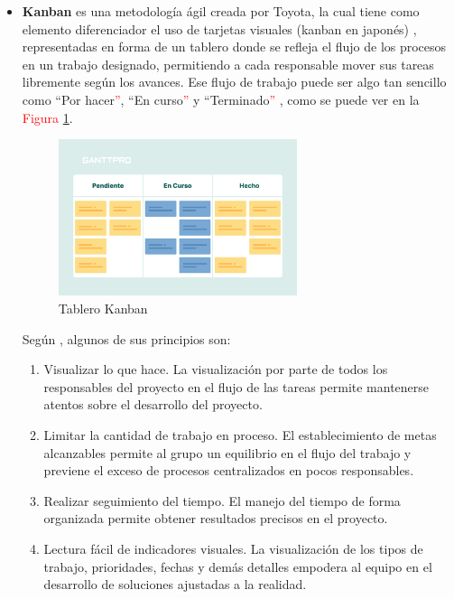 \begin{itemize}
            \item \textbf{Kanban} es una metodología ágil creada por Toyota, la cual tiene como elemento diferenciador el uso de tarjetas visuales (kanban en japonés) \cite{pzt_metodologias_nodate}, representadas en forma de un tablero donde se refleja el flujo de los procesos en un trabajo designado, permitiendo a cada responsable mover sus tareas libremente según los avances. Ese flujo de trabajo puede ser algo tan sencillo como ``Por hacer\textcolor{red}{''}, %
            ``En curso\textcolor{red}{''} y %
            ``Terminado\textcolor{red}{''} %
            \cite{atlassian_que_nodate-1}, como se puede ver en la \textcolor{red}{Figura} %
            \ref{fig:metodologia:kanban}.
    
            \begin{figure}[h]
                \centering
                \includegraphics[width=0.66\textwidth]{figures/kanban.png}
                \caption[Tablero Kanban, extraído de \cite{stsepanets_metodo_2024}]{Tablero Kanban}
                \label{fig:metodologia:kanban}
            \end{figure}
            
    
            Según \cite{valtx_metodologias_2023}, algunos de sus principios son: 
    
            \begin{enumerate}
                \item Visualizar lo que hace. La visualización por parte de todos los responsables del proyecto en el flujo de las tareas permite mantenerse atentos sobre el desarrollo del proyecto.
                \item Limitar la cantidad de trabajo en proceso. El establecimiento de metas alcanzables permite al grupo un equilibrio en el flujo del trabajo y previene el exceso de procesos centralizados en pocos responsables.
                \item Realizar seguimiento del tiempo. El manejo del tiempo de forma organizada permite obtener resultados precisos en el proyecto.
                \item Lectura fácil de indicadores visuales. La visualización de los tipos de trabajo, prioridades, fechas y demás detalles empodera al equipo en el desarrollo de soluciones ajustadas a la realidad.
            \end{enumerate}
            
        \end{itemize}

